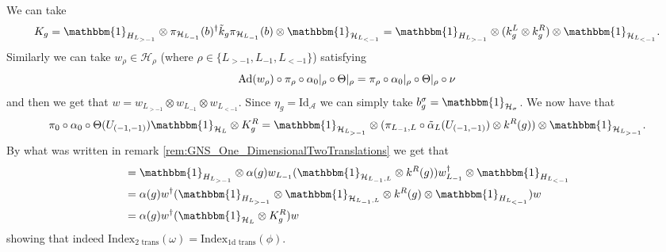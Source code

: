 \documentclass[12pt,a4paper,twoside]{article}
\let\originalleft\left
\let\originalright\right
\renewcommand{\left}{\mathopen{}\mathclose\bgroup\originalleft}
\renewcommand{\right}{\aftergroup\egroup\originalright}
\newcommand{\HH}{\mathcal H}
\renewcommand{\AA}{\mathcal A}
\newcommand{\id}{\mathbbm{1}}
\newcommand{\Ad}[1]{\textrm{Ad}\left(#1\right)}
\theoremstyle{definition}
\numberwithin{equation}{section}
\begin{document}
We can take
\begin{equation}
	K_g=\id_{H_{L_{>-1}}}\otimes \pi_{\HH_{L_{-1}}}(b)^\dagger \tilde k_g \pi_{\HH_{L_{-1}}}(b) \otimes\id_{\HH_{L_{<-1}}} =\id_{H_{L_{>-1}}}\otimes (k_g^L\otimes k_g^R) \otimes\id_{\HH_{L_{<-1}}}.
\end{equation}
Similarly we can take $w_\rho\in\HH_\rho$ (where $\rho\in\{L_{>-1},L_{-1},L_{<-1}\}$) satisfying
\begin{equation}
	\Ad{w_\rho}\circ\pi_\rho\circ\alpha_{0}|_\rho\circ\Theta|_\rho=\pi_\rho\circ\alpha_{0}|_\rho\circ\Theta|_\rho\circ\nu
\end{equation}
and then we get that $w=w_{L_{>-1}}\otimes w_{L_{-1}}\otimes w_{L_{<-1}}$. Since $\eta_g=\textrm{Id}_{\AA}$ we can simply take $b_g^\sigma=\id_{\HH_\sigma}$. We now have that
\begin{equation}
	\pi_0\circ\alpha_0\circ\Theta(U_{(-1,-1)})\id_{\HH_L}\otimes K_g^R=\id_{\HH_{L_{>-1}}}\otimes(\pi_{L_{-1},L}\circ\tilde\alpha_L(U_{(-1,-1)})\otimes k^R(g))\otimes\id_{\HH_{L_{>-1}}}.
\end{equation}
By what was written in remark \ref{rem:GNS_One_DimensionalTwoTranslations} we get that
\begin{align}
	&=\id_{H_{L_{>-1}}}\otimes\alpha(g) w_{L_{-1}}(\id_{\HH_{L_{-1},L}}\otimes k^R(g))w_{L_{-1}}^\dagger\otimes \id_{H_{L_{<-1}}}\\
	&=\alpha(g)w^\dagger (\id_{H_{L_{>-1}}}\otimes \id_{\HH_{L_{-1},L}}\otimes k^R(g)\otimes \id_{H_{L_{<-1}}}) w\\
	&=\alpha(g)w^\dagger (\id_{\HH_L}\otimes K^R_g) w
\end{align}
showing that indeed $\textrm{Index}_{\text{2 trans}}(\omega)=\textrm{Index}_{\text{1d trans}}(\phi)$.
\end{document}
